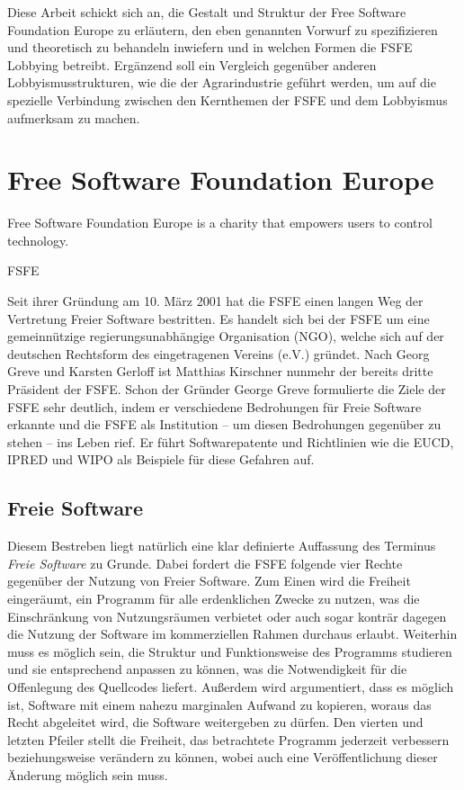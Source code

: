 Diese Arbeit schickt sich an, die Gestalt und Struktur der Free Software 
Foundation Europe zu erläutern, den eben genannten Vorwurf zu spezifizieren und 
theoretisch zu behandeln inwiefern und in welchen Formen die FSFE Lobbying 
betreibt. Ergänzend soll ein Vergleich gegenüber anderen Lobbyismusstrukturen,
wie die der Agrarindustrie geführt werden, um auf die spezielle Verbindung 
zwischen den Kernthemen der FSFE und dem Lobbyismus aufmerksam zu machen.
\newpage

\section{Free Software Foundation Europe}
\epigraph{Free Software Foundation Europe is a charity that empowers
users to control technology.}{FSFE}
Seit ihrer Gründung am 10. März 2001 hat die FSFE einen langen Weg der 
Vertretung Freier Software bestritten. Es handelt sich bei der FSFE 
um eine gemeinnützige regierungsunabhängige Organisation (NGO), welche sich
auf der deutschen Rechtsform des eingetragenen Vereins (e.V.) gründet. Nach 
Georg 
Greve und Karsten Gerloff ist Matthias Kirschner nunmehr der bereits dritte 
Präsident der FSFE. Schon der Gründer George Greve formulierte die Ziele der 
FSFE sehr deutlich, indem er verschiedene Bedrohungen für Freie Software 
erkannte und die FSFE als Institution -- um diesen Bedrohungen gegenüber zu 
stehen -- ins Leben rief. \cite{PLGreveInterView} Er führt Softwarepatente und 
Richtlinien wie \zB die EUCD, IPRED und 
WIPO als Beispiele für diese Gefahren auf.

\subsection{Freie Software}
Diesem Bestreben liegt natürlich eine klar definierte Auffassung des Terminus
\emph{Freie Software} zu Grunde. Dabei fordert die FSFE folgende vier
Rechte gegenüber der Nutzung von Freier Software. Zum Einen
wird die Freiheit eingeräumt, ein Programm für alle erdenklichen Zwecke zu 
nutzen, was \zB die Einschränkung von Nutzungsräumen verbietet oder
auch sogar konträr dagegen die Nutzung der Software im kommerziellen Rahmen 
durchaus %
erlaubt. Weiterhin muss es möglich sein, die Struktur und Funktionsweise des 
Programms studieren und sie entsprechend
anpassen zu können, was die Notwendigkeit für die Offenlegung des Quellcodes 
liefert. Außerdem wird argumentiert, dass es möglich ist, Software mit einem 
nahezu marginalen Aufwand zu kopieren, woraus das Recht abgeleitet wird,
die Software weitergeben zu dürfen. Den
vierten und letzten Pfeiler stellt die Freiheit, das betrachtete Programm
jederzeit verbessern beziehungsweise verändern zu können, wobei auch eine 
Veröffentlichung dieser Änderung möglich sein muss.\cite{FsfeFs}

